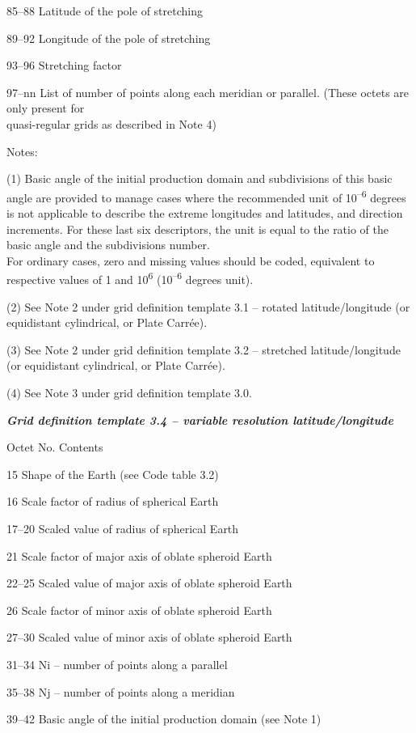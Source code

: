 85--88 Latitude of the pole of stretching

89--92 Longitude of the pole of stretching

93--96 Stretching factor

97--nn List of number of points along each meridian or parallel. (These octets are only present for\\
quasi-regular grids as described in Note 4)

Notes:

(1) Basic angle of the initial production domain and subdivisions of this basic angle are provided to manage cases where the recommended unit of 10\textsuperscript{--6} degrees is not applicable to describe the extreme longitudes and latitudes, and direction increments. For these last six descriptors, the unit is equal to the ratio of the basic angle and the subdivisions number.\\
For ordinary cases, zero and missing values should be coded, equivalent to respective values of 1 and 10\textsuperscript{6} (10\textsuperscript{--6} degrees unit).

(2) See Note 2 under grid definition template 3.1 -- rotated latitude/longitude (or equidistant cylindrical, or Plate Carrée).

(3) See Note 2 under grid definition template 3.2 -- stretched latitude/longitude (or equidistant cylindrical, or Plate Carrée).

(4) See Note 3 under grid definition template 3.0.

\emph{\textbf{Grid definition template 3.4 -- variable resolution latitude/longitude}}

Octet No. Contents

15 Shape of the Earth (see Code table 3.2)

16 Scale factor of radius of spherical Earth

17--20 Scaled value of radius of spherical Earth

21 Scale factor of major axis of oblate spheroid Earth

22--25 Scaled value of major axis of oblate spheroid Earth

26 Scale factor of minor axis of oblate spheroid Earth

27--30 Scaled value of minor axis of oblate spheroid Earth

31--34 Ni -- number of points along a parallel

35--38 Nj -- number of points along a meridian

39--42 Basic angle of the initial production domain (see Note 1)

